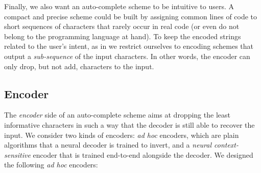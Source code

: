 \documentclass{article}
\begin{document}
Finally, we also want an auto-complete scheme to be
intuitive to users. A compact and precise scheme could
be built by assigning common lines of code to short sequences of characters that rarely occur in real code (or even do not belong to the programming language at hand). To keep the encoded strings related to the user's intent,
as in \cite{lee2019learning} we restrict ourselves to
encoding schemes that output a \emph{sub-sequence} of the
input characters. In other words, the encoder can only drop, but not
add, characters to the input.

\subsection{Encoder}

The \emph{encoder} side of an auto-complete scheme aims
at dropping the least informative characters in such a
way that the decoder is still able to recover the input.
We consider two kinds of encoders: \emph{ad hoc} encoders,
which are plain algorithms that a neural decoder is trained
to invert, and a \emph{neural context-sensitive}
encoder that is trained end-to-end alongside the decoder.
We designed the following \emph{ad hoc} encoders:
\end{document}
